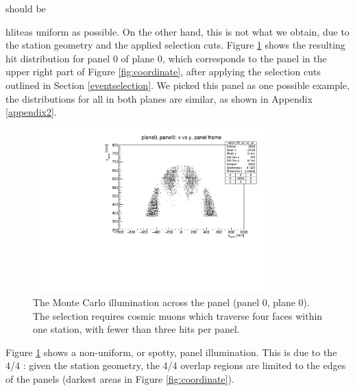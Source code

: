should be {hlite{as uniform as possible}.
%
  On the other hand, this is 
not what we obtain, due to the station geometry
and the applied selection cuts. 
Figure \ref{fig:illumination} shows the 
resulting hit distribution for panel 0 of
plane 0, which corresponds 
to the panel in 
the upper right part of Figure \ref{fig:coordinate}, 
after applying the selection cuts 
outlined in Section 
\ref{eventselection}. 
We picked this panel as one possible 
example, the 
distributions for all  in 
both planes are similar, as
shown in Appendix \ref{appendix2}.

\begin{figure}[!h]
    \centering
    \includegraphics[width =0.8\textwidth]{figures/pdf/xp_vs_yp_panel0.pdf}
    \caption[Monte Carlo illumination across 
    the panel (panel 0, plane 0).]{
        The Monte Carlo illumination 
        across the panel (panel 0, plane 0).
        The selection requires cosmic muons which 
        traverse four faces within one station, with 
        fewer than three hits per panel.}
    \label{fig:illumination}
\end{figure}
Figure \ref{fig:illumination} shows a 
non-uniform, or spotty, 
panel illumination. This is due to the 4/4 : 
given the station geometry, the  4/4 overlap 
regions are 
limited to the edges of the panels (darkest 
areas in Figure \ref{fig:coordinate}). 

}
